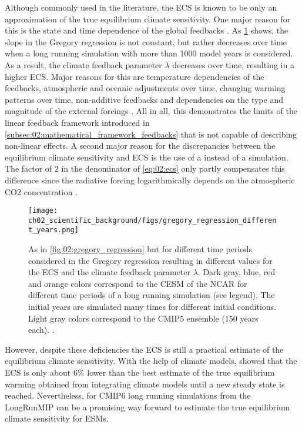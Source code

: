 Although commonly used in the literature, the \ac{ECS} is known to be only an
approximation of the true equilibrium climate sensitivity. One major reason for
this is the state and time dependence of the global feedbacks
\autocite{Knutti2015, Knutti2017}. As
\cref{fig:02:gregory_regression_different_years} shows, the slope in the
Gregory regression is not constant, but rather decreases over time when a long
running  simulation with more than 1000 model years is considered.
As a result, the climate feedback parameter $\lambda$ decreases over time,
resulting in a higher \ac{ECS}. Major reasons for this are temperature
dependencies of the feedbacks, atmospheric and oceanic adjustments over time,
changing warming patterns over time, non-additive feedbacks and dependencies on
the type and magnitude of the external forcings \autocite{Knutti2017}. All in
all, this demonstrates the limits of the linear feedback framework introduced
in \cref{subsec:02:mathematical_framework_feedbacks} that is not capable of
describing non-linear effects. A second major reason for the discrepancies
between the equilibrium climate sensitivity and \ac{ECS} is the use of a
 instead of a  simulation. The factor of $2$ in the
denominator of \cref{eq:02:ecs} only partly compensates this difference since
the radiative forcing logarithmically depends on the atmospheric \ac{CO2}
concentration \autocite{Huang2014}.

\begin{figure}[t]
  \centering
  \texttt{[image: 
    ch02\_scientific\_background/figs/gregory\_regression\_different\_years.png]}
  \caption{As in \cref{fig:02:gregory_regression} but for different time
    periods considered in the Gregory regression resulting in different values
    for the \acf{ECS} and the climate feedback parameter $\lambda$. Dark gray,
    blue, red and orange colors correspond to the \acf{CESM} of the \acf{NCAR}
    for different time periods of a long running simulation (see legend). The
    initial years are simulated many times for different initial conditions.
    Light gray colors correspond to the \acs{CMIP}5 ensemble (150 years each).
    .}
  \label{fig:02:gregory_regression_different_years}
\end{figure}

However, despite these deficiencies the \ac{ECS} is still a practical estimate
of the equilibrium climate sensitivity. With the help of climate models,
\textcite{Sherwood2020} showed that the \ac{ECS} is only about $6 \unit{\%}$
lower than the best estimate of the true equilibrium warming obtained from
integrating climate models until a new steady state is reached. Nevertheless,
for \acs{CMIP}6 long running simulations from the \ac{LongRunMIP}
\autocite{Rugenstein2019} can be a promising way forward to estimate the true
equilibrium climate sensitivity for \acp{ESM}.


